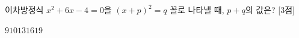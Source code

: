 이차방정식 $x^2+6x-4=0$을 $(x+p)^2=q$ 꼴로 나타낼 때, $p+q$의 값은?  \mbox{[3점]}
\begin{choices32}{$9$}{$10$}{$13$}{$16$}{$19$}\end{choices32}
